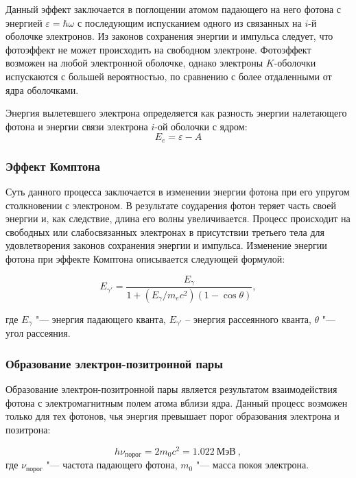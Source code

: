 Данный эффект заключается в поглощении атомом падающего на него фотона с энергией \(\varepsilon =\hbar\omega\) с последующим испусканием одного из связанных на \(i\)-й оболочке электронов. Из законов сохранения энергии и импульса следует, что фотоэффект не может происходить на свободном электроне. Фотоэффект возможен на любой электронной оболочке, однако электроны \(K\)-оболочки испускаются с большей вероятностью, по сравнению с более отдаленными от ядра оболочками.

Энергия вылетевшего электрона определяется как разность энергии налетающего фотона и энергии связи электрона \(i\)-ой оболочки с ядром:
\begin{equation}\label{eq:photo_eff}
E_e=\varepsilon-A
\end{equation}

\subsubsection{Эффект Комптона} 

Суть данного процесса заключается в изменении энергии фотона при его упругом столкновении с электроном. В результате соударения фотон теряет часть своей энергии и, как следствие, длина его волны увеличивается. Процесс происходит на свободных или слабосвязанных электронах в присутствии третьего тела для удовлетворения законов сохранения энергии и импульса. Изменение энергии фотона при эффекте Комптона описывается следующей формулой:

\begin{equation}\label{eq2}
E_{\gamma '}= \frac{E_{\gamma}}{1+(E_{\gamma}/m_ec^{2})(1-\cos\theta)},
\end{equation}

где \(E_{\gamma}\) "--- энергия падающего кванта, \(E_{\gamma '}\) -- энергия рассеянного кванта, \(\theta\) "--- угол рассеяния.

\subsubsection{Образование электрон-позитронной пары} 

Образование электрон-позитронной пары является результатом взаимодействия фотона с электромагнитным полем атома вблизи ядра. Данный процесс возможен только для тех фотонов, чья энергия превышает порог образования электрона и позитрона:

\begin{equation}\label{eq3}
	h\nu_\text{порог}=2m_0c^2=1.022 \ \text{МэВ}\ ,
\end{equation}
где \(\nu_\text{порог}\) "--- частота падающего фотона, \(m_0\) "--- масса покоя электрона.

